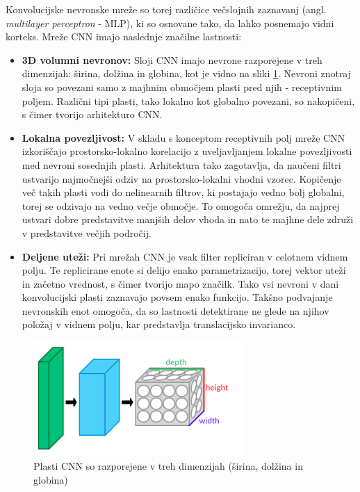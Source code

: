 \documentclass[runningheads,a4paper]{llncs}
\begin{document}
Konvolucijske nevronske mreže so torej različice večslojnih zaznavanj (angl. \textit{multilayer perceptron} - MLP), ki so osnovane tako, da lahko posnemajo vidni korteks. Mreže CNN imajo naslednje značilne lastnosti:
\begin{itemize}
\item \textbf{3D volumni nevronov:} Sloji CNN imajo nevrone razporejene v treh dimenzijah: širina, dolžina in globina, kot je vidno na sliki \ref{fig:layersCNN}. Nevroni znotraj sloja so povezani samo z majhnim območjem plasti pred njih - receptivnim poljem. Različni tipi plasti, tako lokalno kot globalno povezani, so nakopičeni, s čimer tvorijo arhitekturo CNN.

\item \textbf{Lokalna povezljivost:} V skladu s konceptom receptivnih polj mreže CNN izkoriščajo prostorsko-lokalno korelacijo z uveljavljanjem lokalne povezljivosti med nevroni sosednjih plasti. Arhitektura tako zagotavlja, da naučeni filtri ustvarijo najmočnejši odziv na prostorsko-lokalni vhodni vzorec. Kopičenje več takih plasti vodi do nelinearnih filtrov, ki postajajo vedno bolj globalni, torej se odzivajo na vedno večje območje. To omogoča omrežju, da najprej ustvari dobre predstavitve manjših delov vhoda in nato te majhne dele združi v predstavitve večjih področij.

\item \textbf{Deljene uteži:} Pri mrežah CNN je vsak filter repliciran v celotnem vidnem polju. Te replicirane enote si delijo enako parametrizacijo, torej vektor uteži in začetno vrednost, s čimer tvorijo mapo značilk. Tako vsi nevroni v dani konvolucijski plasti zaznavajo povsem enako funkcijo. Takšno podvajanje nevronskih enot omogoča, da so lastnosti detektirane ne glede na njihov položaj v vidnem polju, kar predstavlja translacijsko invarianco.
\end{itemize}

\begin{figure}[H]
\centering
\includegraphics[width=80mm]{figures/Conv_layers.png}
\caption{Plasti CNN so razporejene v treh dimenzijah (širina, dolžina in globina)}
\label{fig:layersCNN}
\end{figure}
\end{document}
